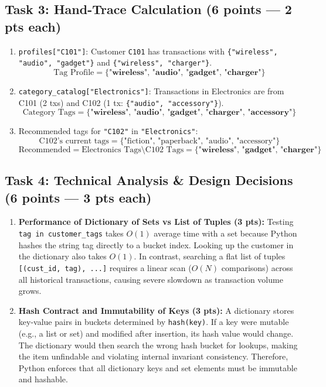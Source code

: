 \documentclass[11pt,a4paper]{article}
\begin{document}
\subsection*{Task 3: Hand-Trace Calculation (6 points --- 2 pts each)}
\begin{enumerate}
\item \texttt{profiles["C101"]}: Customer \texttt{C101} has transactions with \texttt{\{"wireless", "audio", "gadget"\}} and \texttt{\{"wireless", "charger"\}}.
  $$\text{Tag Profile} = \mathbf{\{\text{"wireless", "audio", "gadget", "charger"\}}}$$
\item \texttt{category\_catalog["Electronics"]}: Transactions in Electronics are from C101 (2 txs) and C102 (1 tx: \texttt{\{"audio", "accessory"\}}).
  $$\text{Category Tags} = \mathbf{\{\text{"wireless", "audio", "gadget", "charger", "accessory"\}}}$$
\item Recommended tags for \texttt{"C102"} in \texttt{"Electronics"}:
  $$\text{C102's current tags} = \{\text{"fiction", "paperback", "audio", "accessory"}\}$$
  $$\text{Recommended} = \text{Electronics Tags} \setminus \text{C102 Tags} = \mathbf{\{\text{"wireless", "gadget", "charger"\}}}$$
\end{enumerate}

\subsection*{Task 4: Technical Analysis \& Design Decisions (6 points --- 3 pts each)}
\begin{enumerate}[label=\alph*)]
\item \textbf{Performance of Dictionary of Sets vs List of Tuples (3 pts):}
  Testing \texttt{tag in customer\_tags} takes $O(1)$ average time with a set because Python hashes the string tag directly to a bucket index. Looking up the customer in the dictionary also takes $O(1)$. In contrast, searching a flat list of tuples \texttt{[(cust\_id, tag), ...]} requires a linear scan ($O(N)$ comparisons) across all historical transactions, causing severe slowdown as transaction volume grows.
\item \textbf{Hash Contract and Immutability of Keys (3 pts):}
  A dictionary stores key-value pairs in buckets determined by \texttt{hash(key)}. If a key were mutable (e.g., a list or set) and modified after insertion, its hash value would change. The dictionary would then search the wrong hash bucket for lookups, making the item unfindable and violating internal invariant consistency. Therefore, Python enforces that all dictionary keys and set elements must be immutable and hashable.
\end{enumerate}
\end{document}

